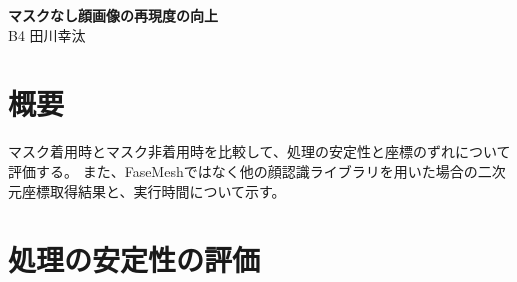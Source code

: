 \documentclass[]{jarticle}          %
\begin{document}

\vspace*{2ex}
\begin{center}
 {\Large \bf マスクなし顔画像の再現度の向上}\\ %
 \vspace*{5mm}
 {\large B4 田川幸汰}%
\end{center}







\section{概要}
マスク着用時とマスク非着用時を比較して、処理の安定性と座標のずれについて評価する。
また、FaseMeshではなく他の顔認識ライブラリを用いた場合の二次元座標取得結果と、実行時間について示す。

\section{処理の安定性の評価}
\end{document}

